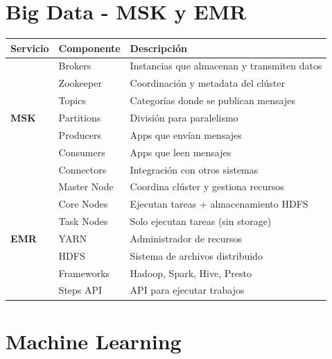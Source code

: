 \documentclass[12pt,a4paper]{report}
\newcommand{\awsservice}[1]{\textcolor{awsorange}{\textbf{#1}}}
\begin{document}
\section{Big Data - MSK y EMR}

\begin{center}
\begin{longtable}{|p{2cm}|p{3cm}|p{7cm}|}
\hline
\cellcolor{awsblue!20}\textbf{Servicio} & \cellcolor{awsblue!20}\textbf{Componente} & \cellcolor{awsblue!20}\textbf{Descripción} \\
\hline
\multirow{7}{*}{\awsservice{MSK}} & Brokers & Instancias que almacenan y transmiten datos \\
\cline{2-3}
& Zookeeper & Coordinación y metadata del clúster \\
\cline{2-3}
& Topics & Categorías donde se publican mensajes \\
\cline{2-3}
& Partitions & División para paralelismo \\
\cline{2-3}
& Producers & Apps que envían mensajes \\
\cline{2-3}
& Consumers & Apps que leen mensajes \\
\cline{2-3}
& Connectors & Integración con otros sistemas \\
\hline
\multirow{7}{*}{\awsservice{EMR}} & Master Node & Coordina clúster y gestiona recursos \\
\cline{2-3}
& Core Nodes & Ejecutan tareas + almacenamiento HDFS \\
\cline{2-3}
& Task Nodes & Solo ejecutan tareas (sin storage) \\
\cline{2-3}
& YARN & Administrador de recursos \\
\cline{2-3}
& HDFS & Sistema de archivos distribuido \\
\cline{2-3}
& Frameworks & Hadoop, Spark, Hive, Presto \\
\cline{2-3}
& Steps API & API para ejecutar trabajos \\
\hline
\end{longtable}
\end{center}

\section{Machine Learning}
\end{document}
